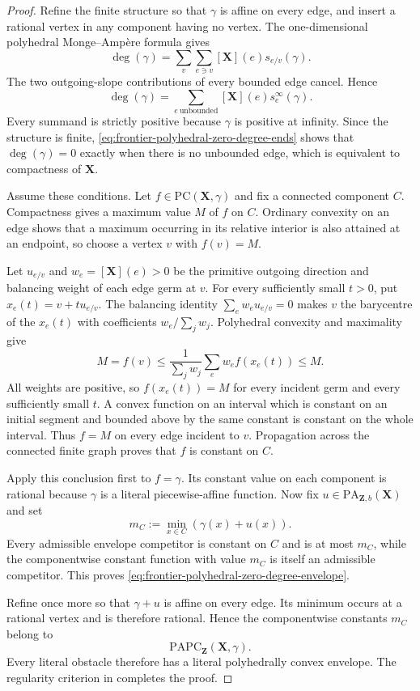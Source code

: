 
\begin{proof}
Refine the finite structure so that $\gamma$ is affine on every edge, and
insert a rational vertex in any component having no vertex.  The
one-dimensional polyhedral Monge--Amp\`ere formula gives
\[
 \deg(\gamma)
 =\sum_v\sum_{e\ni v}[\mathbf X](e)s_{e/v}(\gamma).
\]
The two outgoing-slope contributions of every bounded edge cancel.  Hence
\begin{equation}
 \deg(\gamma)
 =\sum_{e\ \mathrm{unbounded}}
   [\mathbf X](e)s_e^\infty(\gamma).
 \label{eq:frontier-polyhedral-zero-degree-ends}
\end{equation}
Every summand is strictly positive because $\gamma$ is positive at
infinity.  Since the structure is finite,
\eqref{eq:frontier-polyhedral-zero-degree-ends} shows that
$\deg(\gamma)=0$ exactly when there is no unbounded edge, which is equivalent
to compactness of $\mathbf X$.

Assume these conditions.  Let $f\in\mathrm{PC}(\mathbf X,\gamma)$ and fix a
connected component $C$.  Compactness gives a maximum value $M$ of $f$ on
$C$.  Ordinary convexity on an edge shows that a maximum occurring in its
relative interior is also attained at an endpoint, so choose a vertex $v$
with $f(v)=M$.

Let $u_{e/v}$ and $w_e=[\mathbf X](e)>0$ be the primitive outgoing direction
and balancing weight of each edge germ at $v$.  For every sufficiently small
$t>0$, put $x_e(t)=v+tu_{e/v}$.  The balancing identity
$\sum_e w_eu_{e/v}=0$ makes $v$ the barycentre of the $x_e(t)$ with
coefficients $w_e/\sum_jw_j$.  Polyhedral convexity and maximality give
\[
 M=f(v)
 \leq\frac{1}{\sum_jw_j}\sum_e w_ef(x_e(t))
 \leq M.
\]
All weights are positive, so $f(x_e(t))=M$ for every incident germ and every
sufficiently small $t$.  A convex function on an interval which is constant
on an initial segment and bounded above by the same constant is constant on
the whole interval.  Thus $f=M$ on every edge incident to $v$.  Propagation
across the connected finite graph proves that $f$ is constant on $C$.

Apply this conclusion first to $f=\gamma$.  Its constant value on each
component is rational because $\gamma$ is a literal piecewise-affine
function.  Now fix $u\in\mathrm{PA}_{\mathbf Z,b}(\mathbf X)$ and set
\[
                 m_C:=\min_{x\in C}(\gamma(x)+u(x)).
\]
Every admissible envelope competitor is constant on $C$ and is at most
$m_C$, while the componentwise constant function with value $m_C$ is itself
an admissible competitor.  This proves
\eqref{eq:frontier-polyhedral-zero-degree-envelope}.

Refine once more so that $\gamma+u$ is affine on every edge.  Its minimum
occurs at a rational vertex and is therefore rational.  Hence the
componentwise constants $m_C$ belong to
\[
                 \mathrm{PAPC}_{\mathbf Z}(\mathbf X,\gamma).
\]
Every literal obstacle therefore has a literal polyhedrally convex envelope.
The regularity criterion in
\cite[Theorem~6.4 and Definition~6.5]{BMPS26} completes the proof.
\end{proof}
